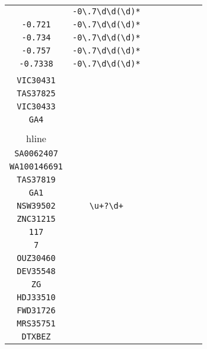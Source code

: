 \begin{longtable}{cccccccc}
\begin{tabular}{ll}
    \verb|-0.799| & \verb|-0\.7\d\d(\d)*|\\
\verb|-0.721| & \verb|-0\.7\d\d(\d)*|\\
\verb|-0.734| & \verb|-0\.7\d\d(\d)*|\\
\verb|-0.757| & \verb|-0\.7\d\d(\d)*|\\
\verb|-0.7338| & \verb|-0\.7\d\d(\d)*|
\end{tabular}
\\\midrule 
\begin{tabular}{l}
    \verb|TAS37818|\\
\verb|VIC30431|\\
\verb|TAS37825|\\
\verb|VIC30433|\\
\verb|GA4|\\
\\hline\\
\verb|SA0062407|\\
\verb|WA100146691|\\
\verb|TAS37819|\\
\verb|GA1|\\
\verb|NSW39502|
\end{tabular}

&
\verb|\u+?\d+|
&

\begin{tabular}{l}
    \verb.((\u)*(\d)*)|(\u\u\u3\d\d\d\d).\\
\verb|ZNC31215|\\
\verb|117|\\
\verb|7|\\
\verb|OUZ30460|\\
\verb|DEV35548|
\end{tabular}

&

\begin{tabular}{l}
    \verb.\u\u((\u)*(\d)*)|(\u3\d\d\d\d).\\
\verb|ZG|\\
\verb|HDJ33510|\\
\verb|FWD31726|\\
\verb|MRS35751|\\
\verb|DTXBEZ|
\end{tabular}

&


\end{longtable}
